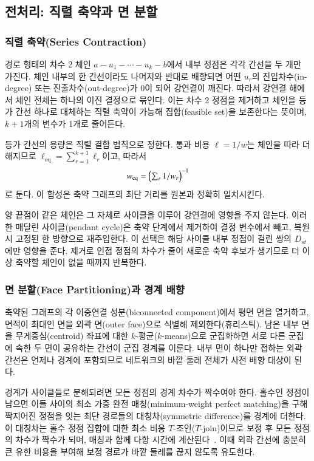 \documentclass[twocolumn,a4paper]{article}
\begin{document}
\subsection{전처리: 직렬 축약과 면 분할} \label{subsec:method_pre}

\subsubsection*{직렬 축약(Series Contraction)}

경로 형태의 차수 2 체인 \(a-u_1-\cdots-u_k-b\)에서 내부 정점은 각각 간선을 두 개만 가진다. 체인 내부의 한 간선이라도 나머지와 반대로 배향되면 어떤 \(u_r\)의 진입차수(in-degree) 또는 진출차수(out-degree)가 0이 되어 강연결이 깨진다. 따라서 강연결 해에서 체인 전체는 하나의 이진 결정으로 묶인다. 이는 차수 2 정점을 제거하고 체인을 등가 간선 하나로 대체하는 직렬 축약이 가능해 집합(feasible set)을 보존한다는 뜻이며, \(k+1\)개의 변수가 1개로 줄어든다.

등가 간선의 용량은 직렬 결합 법칙으로 정한다. 통과 비용 \(\ell=1/w\)는 체인을 따라 더해지므로 \(\ell_{\mathrm{eq}}=\sum_{r=1}^{k+1}\ell_r\)이고, 따라서
\begin{equation}
    w_{\mathrm{eq}}=\Bigl(\textstyle\sum_{r}1/w_{r}\Bigr)^{-1}
\end{equation}
로 둔다. 이 합성은 축약 그래프의 최단 거리를 원본과 정확히 일치시킨다.

양 끝점이 같은 체인은 그 자체로 사이클을 이루어 강연결에 영향을 주지 않는다. 이러한 매달린 사이클(pendant cycle)은 축약 단계에서 제거하여 결정 변수에서 빼고, 복원 시 고정된 한 방향으로 재주입한다. 이 선택은 해당 사이클 내부 정점이 걸린 쌍의 \(D_{st}\)에만 영향을 준다. 제거로 인접 정점의 차수가 줄어 새로운 축약 후보가 생기므로 더 이상 축약할 체인이 없을 때까지 반복한다.

\subsubsection*{면 분할(Face Partitioning)과 경계 배향}

축약된 그래프의 각 이중연결 성분(biconnected component)에서 평면 면을 열거하고, 면적이 최대인 면을 외곽 면(outer face)으로 식별해 제외한다(휴리스틱). 남은 내부 면을 무게중심(centroid) 좌표에 대한 \(k\)-평균(\(k\)-means)으로 군집화하면 서로 다른 군집에 속한 두 면이 공유하는 간선이 군집 경계를 이룬다. 내부 면이 하나만 접하는 외곽 간선은 언제나 경계에 포함되므로 네트워크의 바깥 둘레 전체가 사전 배향 대상이 된다.

경계가 사이클들로 분해되려면 모든 정점의 경계 차수가 짝수여야 한다. 홀수인 정점이 남으면 이들 사이의 최소 가중 완전 매칭(minimum-weight perfect matching)을 구해 짝지어진 정점을 잇는 최단 경로들의 대칭차(symmetric difference)를 경계에 더한다. 이 대칭차는 홀수 정점 집합에 대한 최소 비용 \(T\)-조인(\(T\)-join)이므로 보정 후 모든 정점의 차수가 짝수가 되며, 매칭과 함께 다항 시간에 계산된다~\cite{edmonds1973matching}. 이때 외곽 간선에 충분히 큰 유한 비용을 부여해 보정 경로가 바깥 둘레를 끊지 않도록 유도한다.
\end{document}
